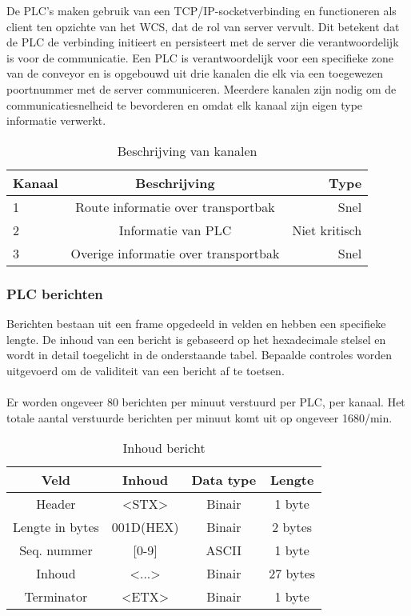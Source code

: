 De PLC's maken gebruik van een TCP/IP-socketverbinding en functioneren als client ten opzichte van het WCS, dat de rol van server vervult. 
Dit betekent dat de PLC de verbinding initieert en persisteert met de server die verantwoordelijk is voor de communicatie.
Een PLC is verantwoordelijk voor een specifieke zone van de conveyor en is opgebouwd uit drie kanalen die elk via een toegewezen poortnummer met de server communiceren. 
Meerdere kanalen zijn nodig om de communicatiesnelheid te bevorderen en omdat elk kanaal zijn eigen type informatie verwerkt.

\begin{table}[!h]
  \centering
  \begin{tabular}{lcr}
    \toprule
    \textbf{Kanaal} & \textbf{Beschrijving} & \textbf{Type}                \\
    \midrule
    1                & Route informatie over transportbak          & Snel           \\
    2                & Informatie van PLC                          & Niet kritisch  \\
    3                & Overige informatie over transportbak        & Snel           \\
    \bottomrule
  \end{tabular}
  \caption[Channel assignment]{\label{tab:channel-assignment}Beschrijving van kanalen}
\end{table}

\subsubsection{PLC berichten}
Berichten bestaan uit een frame opgedeeld in velden en hebben een specifieke lengte.
De inhoud van een bericht is gebaseerd op het hexadecimale stelsel en wordt in detail toegelicht in de onderstaande tabel.
Bepaalde controles worden uitgevoerd om de validiteit van een bericht af te toetsen. 
\\\\
Er worden ongeveer 80 berichten per minuut verstuurd per PLC, per kanaal.
Het totale aantal verstuurde berichten per minuut komt uit op ongeveer 1680/min.

\begin{table}[h!]
\centering 
\begin{tabular}{|c|c|c|c|}
  \hline
  \textbf{Veld} & \textbf{Inhoud} & \textbf{Data type} & \textbf{Lengte} \\
  \hline 
  Header & <STX> & Binair & 1 byte \\
  \hline 
  Lengte in bytes & 001D(HEX) & Binair & 2 bytes \\
  \hline 
  Seq. nummer &  [0-9] & ASCII & 1 byte  \\
  \hline 
  Inhoud & <...> & Binair & 27 bytes \\
  \hline 
  Terminator & <ETX> & Binair & 1 byte \\
  \hline
\end{tabular}
\caption[Message content]{\label{tab:message-content}Inhoud bericht}
\end{table}

